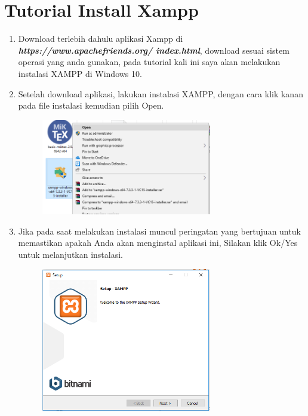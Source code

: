\section{Tutorial Install Xampp}
\begin{enumerate}
    \item Download terlebih dahulu aplikasi Xampp di \textbf{\textit{https://www.apachefriends.org/ index.html}}, download sesuai sistem operasi yang anda gunakan, pada tutorial kali ini saya akan melakukan instalasi XAMPP di Windows 10.
    
	\item Setelah download aplikasi, lakukan instalasi XAMPP, dengan cara klik kanan pada file instalasi kemudian pilih Open.
		\begin{figure}[!htbp]
    		\centering
    		\includegraphics[width=0.7\textwidth]{figures/XAMPP/Xampp2.png}
    		\label{Xampp2}
		\end{figure}
		
	\item Jika pada saat melakukan instalasi muncul peringatan yang bertujuan untuk memastikan apakah Anda akan menginstal aplikasi ini, Silakan klik Ok/Yes untuk melanjutkan instalasi.
		\begin{figure}[!htbp]
    		\centering
    		\includegraphics[width=0.7\textwidth]{figures/XAMPP/Xampp3.PNG}
    		\label{Xampp3}
		\end{figure}
		

\end{enumerate}
